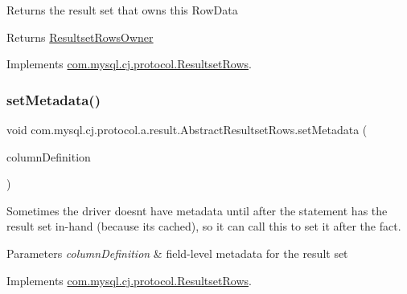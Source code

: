 Returns the result set that \textquotesingle{}owns\textquotesingle{} this Row\+Data

\begin{DoxyReturn}{Returns}
\mbox{\hyperlink{interfacecom_1_1mysql_1_1cj_1_1protocol_1_1_resultset_rows_owner}{Resultset\+Rows\+Owner}} 
\end{DoxyReturn}


Implements \mbox{\hyperlink{interfacecom_1_1mysql_1_1cj_1_1protocol_1_1_resultset_rows_a495e468d6fb9aee61f47343ab45cdd52}{com.\+mysql.\+cj.\+protocol.\+Resultset\+Rows}}.

\mbox{\label{classcom_1_1mysql_1_1cj_1_1protocol_1_1a_1_1result_1_1_abstract_resultset_rows_a13f4342893e5c2c6ca06237af1e585a7}} 
\subsubsection{\texorpdfstring{set\+Metadata()}{setMetadata()}}
{\footnotesize\ttfamily void com.\+mysql.\+cj.\+protocol.\+a.\+result.\+Abstract\+Resultset\+Rows.\+set\+Metadata (\begin{DoxyParamCaption}\item[{\mbox{\hyperlink{interfacecom_1_1mysql_1_1cj_1_1protocol_1_1_column_definition}{Column\+Definition}}}]{column\+Definition }\end{DoxyParamCaption})}

Sometimes the driver doesn\textquotesingle{}t have metadata until after the statement has the result set in-\/hand (because it\textquotesingle{}s cached), so it can call this to set it after the fact.


\begin{DoxyParams}{Parameters}
{\em column\+Definition} & field-\/level metadata for the result set \\
\hline
\end{DoxyParams}


Implements \mbox{\hyperlink{interfacecom_1_1mysql_1_1cj_1_1protocol_1_1_resultset_rows_a5121e355be1da17a4085068bb5611fb0}{com.\+mysql.\+cj.\+protocol.\+Resultset\+Rows}}.

